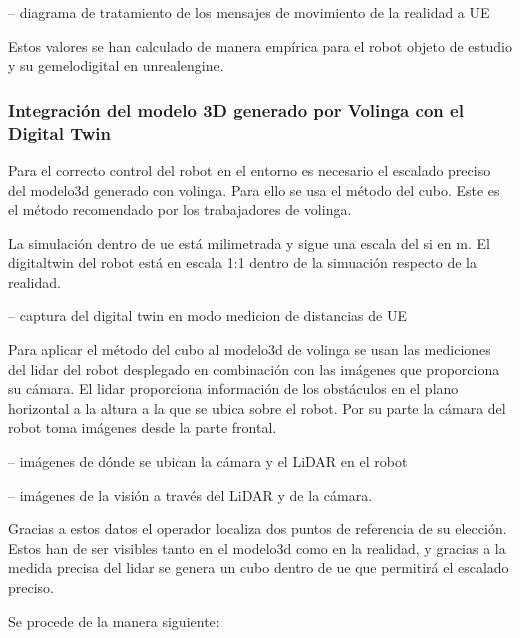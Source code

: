 \documentclass[a4paper, 12pt, spanish, twoside]{article}
\begin{document}
-- diagrama de tratamiento de los mensajes de movimiento de la realidad a UE 

Estos valores se han calculado de manera empírica para el robot objeto de estudio y su \gls{gemelodigital} en \gls{unrealengine}. 

\subsubsection{Integración del modelo 3D generado por Volinga con el Digital Twin} \label{sec:implementacion:nerfstudio-volinga:integracion}

Para el correcto control del robot en el entorno es necesario el escalado preciso del \gls{modelo3d} generado con \gls{volinga}. Para ello se usa el método del cubo. Este es el método recomendado por los trabajadores de \gls{volinga}. 

La simulación dentro de \acrshort{ue} está milimetrada y sigue una escala del \acrshort{si} en \acrshort{m}. El \gls{digitaltwin} del robot está en escala 1:1 dentro de la simuación respecto de la realidad.  

-- captura del digital twin en modo medicion de distancias de UE 

Para aplicar el método del cubo al \gls{modelo3d} de \gls{volinga} se usan las mediciones del \acrshort{lidar} del robot desplegado en combinación con las imágenes que proporciona su cámara. El \acrshort{lidar} proporciona información de los obstáculos en el plano horizontal a la altura a la que se ubica sobre el robot. Por su parte la cámara del robot toma imágenes desde la parte frontal. 

-- imágenes de dónde se ubican la cámara y el LiDAR en el robot 

-- imágenes de la visión a través del LiDAR y de la cámara. 

Gracias a estos datos el operador localiza dos puntos de referencia de su elección. Estos han de ser visibles tanto en el \gls{modelo3d} como en la realidad, y gracias a la medida precisa del \acrshort{lidar} se genera un cubo dentro de \acrshort{ue} que permitirá el escalado preciso. 

Se procede de la manera siguiente: 
\end{document}
